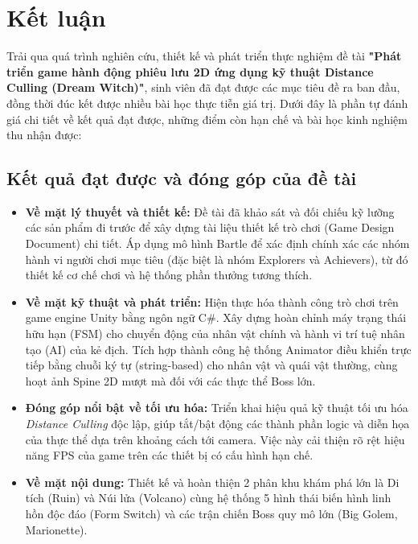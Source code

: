 \documentclass[../DoAn.tex]{subfiles}
\begin{document}
\section{Kết luận}

Trải qua quá trình nghiên cứu, thiết kế và phát triển thực nghiệm đề tài \textbf{"Phát triển game hành động phiêu lưu 2D ứng dụng kỹ thuật Distance Culling (Dream Witch)"}, sinh viên đã đạt được các mục tiêu đề ra ban đầu, đồng thời đúc kết được nhiều bài học thực tiễn giá trị. Dưới đây là phần tự đánh giá chi tiết về kết quả đạt được, những điểm còn hạn chế và bài học kinh nghiệm thu nhận được:

\subsection{Kết quả đạt được và đóng góp của đề tài}
\begin{itemize}
    \item \textbf{Về mặt lý thuyết và thiết kế:} Đề tài đã khảo sát và đối chiếu kỹ lưỡng các sản phẩm đi trước để xây dựng tài liệu thiết kế trò chơi (Game Design Document) chi tiết. Áp dụng mô hình Bartle để xác định chính xác các nhóm hành vi người chơi mục tiêu (đặc biệt là nhóm Explorers và Achievers), từ đó thiết kế cơ chế chơi và hệ thống phần thưởng tương thích.
    \item \textbf{Về mặt kỹ thuật và phát triển:} Hiện thực hóa thành công trò chơi trên game engine Unity bằng ngôn ngữ C\#. Xây dựng hoàn chỉnh máy trạng thái hữu hạn (FSM) cho chuyển động của nhân vật chính và hành vi trí tuệ nhân tạo (AI) của kẻ địch. Tích hợp thành công hệ thống Animator điều khiển trực tiếp bằng chuỗi ký tự (string-based) cho nhân vật và quái vật thường, cùng hoạt ảnh Spine 2D mượt mà đối với các thực thể Boss lớn.
    \item \textbf{Đóng góp nổi bật về tối ưu hóa:} Triển khai hiệu quả kỹ thuật tối ưu hóa \textit{Distance Culling} độc lập, giúp tắt/bật động các thành phần logic và diễn họa của thực thể dựa trên khoảng cách tới camera. Việc này cải thiện rõ rệt hiệu năng FPS của game trên các thiết bị có cấu hình hạn chế.
    \item \textbf{Về mặt nội dung:} Thiết kế và hoàn thiện 2 phân khu khám phá lớn là Di tích (Ruin) và Núi lửa (Volcano) cùng hệ thống 5 hình thái biến hình linh hồn độc đáo (Form Switch) và các trận chiến Boss quy mô lớn (Big Golem, Marionette).
\end{itemize}
\end{document}

